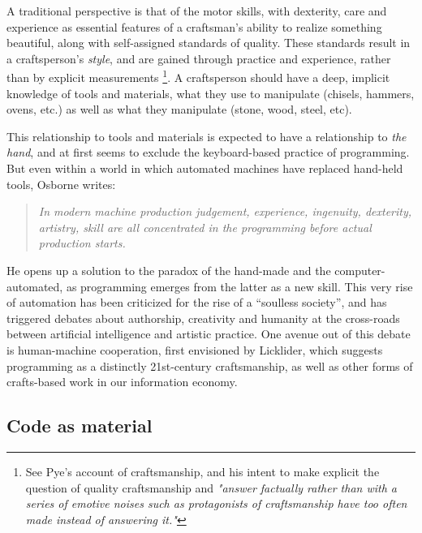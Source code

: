 \documentclass{article}
\begin{document}
A traditional perspective is that of the motor skills, with dexterity, care and experience as essential features of a craftsman's ability to realize something beautiful\cite{osborne_aesthetic_1977}, along with self-assigned standards of quality\cite{pye_nature_2008,sennett_craftsman_2009}. These standards result in a craftsperson's \emph{style}, and are gained through practice and experience, rather than by explicit measurements\cite{pye_nature_2008} \footnote{See Pye's account of craftsmanship, and his intent to make explicit the question of quality craftsmanship and \emph{"answer factually rather than with a series of emotive noises such as protagonists of craftsmanship have too often made instead of answering it."}}. A craftsperson should have a deep, implicit knowledge of tools and materials, what they use to manipulate (chisels, hammers, ovens, etc.) as well as what they manipulate (stone, wood, steel, etc).

This relationship to tools and materials is expected to have a relationship to \emph{the hand}, and at first seems to exclude the keyboard-based practice of programming. But even within a world in which automated machines have replaced hand-held tools, Osborne writes:

\begin{quote}
    \textit{In modern machine production judgement, experience, ingenuity, dexterity, artistry, skill are all concentrated in the programming before actual production starts.\cite{osborne_aesthetic_1977}}
\end{quote}

He opens up a solution to the paradox of the hand-made and the computer-automated, as programming emerges from the latter as a new skill. This very rise of automation has been criticized for the rise of a ``soulless society''\cite{osborne_aesthetic_1977}, and has triggered debates about authorship, creativity and humanity at the cross-roads between artificial intelligence and artistic practice\cite{mazzone_art_2019}. One avenue out of this debate is human-machine cooperation, first envisioned by Licklider\cite{licklider_man-computer_1960,grudin_tool_2016}, which suggests programming as a distinctly 21st-century craftsmanship, as well as other forms of crafts-based work in our information economy.

\subsection{Code as material}
\end{document}
